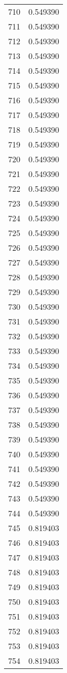 \documentclass[12pt]{article}
\begin{document}
\begin{longtable}{@{}cc@{}}
710 & 0.549390 \\
711 & 0.549390 \\
712 & 0.549390 \\
713 & 0.549390 \\
714 & 0.549390 \\
715 & 0.549390 \\
716 & 0.549390 \\
717 & 0.549390 \\
718 & 0.549390 \\
719 & 0.549390 \\
720 & 0.549390 \\
721 & 0.549390 \\
722 & 0.549390 \\
723 & 0.549390 \\
724 & 0.549390 \\
725 & 0.549390 \\
726 & 0.549390 \\
727 & 0.549390 \\
728 & 0.549390 \\
729 & 0.549390 \\
730 & 0.549390 \\
731 & 0.549390 \\
732 & 0.549390 \\
733 & 0.549390 \\
734 & 0.549390 \\
735 & 0.549390 \\
736 & 0.549390 \\
737 & 0.549390 \\
738 & 0.549390 \\
739 & 0.549390 \\
740 & 0.549390 \\
741 & 0.549390 \\
742 & 0.549390 \\
743 & 0.549390 \\
744 & 0.549390 \\
745 & 0.819403 \\
746 & 0.819403 \\
747 & 0.819403 \\
748 & 0.819403 \\
749 & 0.819403 \\
750 & 0.819403 \\
751 & 0.819403 \\
752 & 0.819403 \\
753 & 0.819403 \\
754 & 0.819403 \\

\end{longtable}
\end{document}
